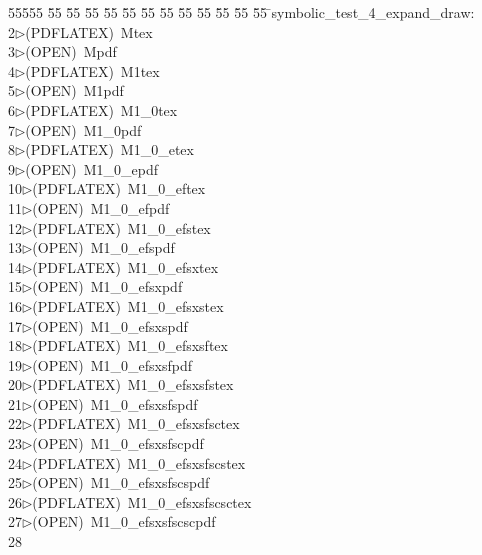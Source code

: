 %
%
\begin{tabbing}
55555 \= 55 \= 55 \= 55 \= 55 \= 55 \= 55 \= 55 \= 55 \= 55 \= 55 \= 55 \= 55 \= \>symbolic\_test\_4\_expand\_draw:\\[0pt]
2\>$\triangleright$\>(PDFLATEX)\ Mtex\\[0pt]
3\>$\triangleright$\>(OPEN)\ Mpdf\\[0pt]
4\>$\triangleright$\>(PDFLATEX)\ M1tex\\[0pt]
5\>$\triangleright$\>(OPEN)\ M1pdf\\[0pt]
6\>$\triangleright$\>(PDFLATEX)\ M1\_0tex\\[0pt]
7\>$\triangleright$\>(OPEN)\ M1\_0pdf\\[0pt]
8\>$\triangleright$\>(PDFLATEX)\ M1\_0\_etex\\[0pt]
9\>$\triangleright$\>(OPEN)\ M1\_0\_epdf\\[0pt]
10\>$\triangleright$\>(PDFLATEX)\ M1\_0\_eftex\\[0pt]
11\>$\triangleright$\>(OPEN)\ M1\_0\_efpdf\\[0pt]
12\>$\triangleright$\>(PDFLATEX)\ M1\_0\_efstex\\[0pt]
13\>$\triangleright$\>(OPEN)\ M1\_0\_efspdf\\[0pt]
14\>$\triangleright$\>(PDFLATEX)\ M1\_0\_efsxtex\\[0pt]
15\>$\triangleright$\>(OPEN)\ M1\_0\_efsxpdf\\[0pt]
16\>$\triangleright$\>(PDFLATEX)\ M1\_0\_efsxstex\\[0pt]
17\>$\triangleright$\>(OPEN)\ M1\_0\_efsxspdf\\[0pt]
18\>$\triangleright$\>(PDFLATEX)\ M1\_0\_efsxsftex\\[0pt]
19\>$\triangleright$\>(OPEN)\ M1\_0\_efsxsfpdf\\[0pt]
20\>$\triangleright$\>(PDFLATEX)\ M1\_0\_efsxsfstex\\[0pt]
21\>$\triangleright$\>(OPEN)\ M1\_0\_efsxsfspdf\\[0pt]
22\>$\triangleright$\>(PDFLATEX)\ M1\_0\_efsxsfsctex\\[0pt]
23\>$\triangleright$\>(OPEN)\ M1\_0\_efsxsfscpdf\\[0pt]
24\>$\triangleright$\>(PDFLATEX)\ M1\_0\_efsxsfscstex\\[0pt]
25\>$\triangleright$\>(OPEN)\ M1\_0\_efsxsfscspdf\\[0pt]
26\>$\triangleright$\>(PDFLATEX)\ M1\_0\_efsxsfscsctex\\[0pt]
27\>$\triangleright$\>(OPEN)\ M1\_0\_efsxsfscscpdf\\[0pt]
28\>\end{tabbing}
